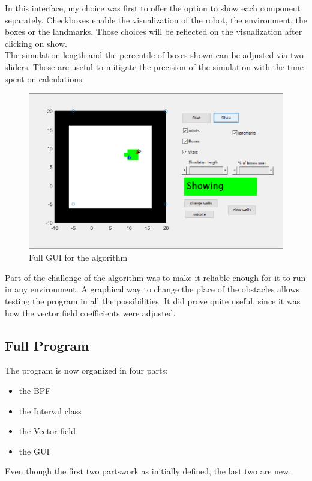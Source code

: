 In this interface, my choice was first to offer the option to show each component separately. Checkboxes enable the visualization of the robot, the environment, the boxes or the landmarks.
Those choices will be reflected on the visualization after clicking on show.\\

The simulation length and the percentile of boxes shown can be adjusted via two sliders.
Those are useful to mitigate the precision of the simulation with the time spent on calculations.\\

\begin{figure}[H]
\centering
\includegraphics[scale=0.7]{Figures/Gui}
\decoRule
\caption[GUI]{Full GUI for the algorithm}
\label{fig:gui}
\end{figure}

Part of the challenge of the algorithm was to make it reliable enough for it to run in any environment.
A graphical way to change the place of the obstacles allows testing the program in all the possibilities.
It did prove quite useful, since it was how the vector field coefficients were adjusted.


\subsection{Full Program}

The program is now organized in four parts:
\begin{itemize}
  \item the BPF
  \item the Interval class
  \item the Vector field
  \item the GUI
\end{itemize}
Even though the first two partswork as initially defined, the last two are new.

